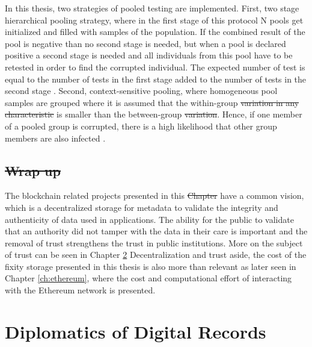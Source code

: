\documentclass[final]{vutinfth}
\providecommand{\DIFaddtex}[1]{{\protect\color{blue}\uwave{#1}}} %
\providecommand{\DIFdeltex}[1]{{\protect\color{red}\sout{#1}}}                      %
\providecommand{\DIFaddbegin}{} %
\providecommand{\DIFaddend}{} %
\providecommand{\DIFdelbegin}{} %
\providecommand{\DIFdelend}{} %
\providecommand{\DIFadd}[1]{\texorpdfstring{\DIFaddtex{#1}}{#1}} %
\providecommand{\DIFdel}[1]{\texorpdfstring{\DIFdeltex{#1}}{}} %
\begin{document}
\DIFaddend In this thesis, two strategies of pooled testing are implemented. 
First, two stage hierarchical pooling strategy, where in the first stage of this protocol N pools get initialized and filled with samples of the population. If the combined result of the pool is negative than no second stage is needed, but when a pool is declared positive a second stage is needed and all individuals from this pool have to be retested in order to find the corrupted individual. The expected number of test is equal to the number of tests in the first stage added to the number of tests in the second stage \cite[3]{nianogo2021optimal}.
Second, context-sensitive pooling, where homogeneous pool samples are grouped where it is assumed that the within-group \DIFdelbegin \DIFdel{variation in any characteristic }\DIFdelend \DIFaddbegin \DIFadd{change rate }\DIFaddend is smaller than the between-group \DIFdelbegin \DIFdel{variation}\DIFdelend \DIFaddbegin \DIFadd{change rate}\DIFaddend . Hence, if one member of a pooled group is corrupted, there is a high likelihood that other group members are also infected \cite[3]{deckert2020simulation}.

\section{\DIFdelbegin \DIFdel{Wrap up}\DIFdelend \DIFaddbegin \DIFadd{Summary}\DIFaddend }
The blockchain related projects presented in this \DIFdelbegin \DIFdel{Chapter }\DIFdelend \DIFaddbegin \DIFadd{chapter }\DIFaddend have a common vision, which is a decentralized storage for metadata to validate the integrity and authenticity of data used in applications. The ability for the public to validate that an authority did not tamper with the data in their care is important and the removal of trust strengthens the trust in public institutions. More on the subject of trust can be seen in Chapter \ref{ch:diplomatics}
Decentralization and trust aside, the cost of the fixity storage presented in this thesis is also more than relevant as later seen in Chapter \ref{ch:ethereum}, where the cost and computational effort of interacting with the Ethereum network is presented.
 \chapter{Diplomatics of Digital Records}
\label{ch:diplomatics}
\end{document}
